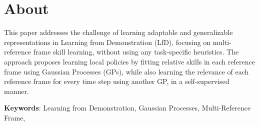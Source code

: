 \section{About}\label{sec:about}

This paper\cite{Montero2024} addresses the challenge of learning adaptable and generalizable representations in Learning from Demonstration (LfD), focusing on multi-reference frame skill learning, without using any task-specific heuristics.
The approach proposes learning local policies by fitting relative skills in each reference frame using Gaussian Processes (GPs), while also learning the relevance of each reference frame for every time step using another GP, in a self-supervised manner.

\textbf{Keywords}:
Learning from Demonstration,
Gaussian Processes,
Multi-Reference Frame,
